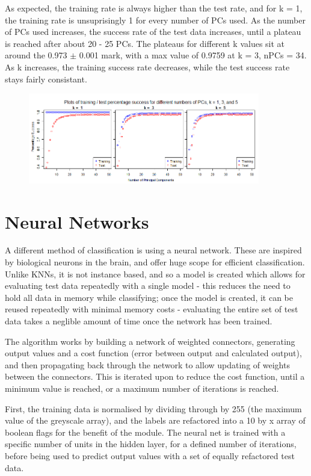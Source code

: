 \documentclass[11pt]{article} %
\begin{document}
As expected, the training rate is always higher than the test rate, and for k = 1, the training rate is unsuprisingly 1 for every number of PCs used. As the number of PCs used increases, the success rate of the test data increases, until a plateau is reached after about 20 - 25 PCs. The plateaus for different k values sit at around the 0.973 $\pm$ 0.001 mark, with a max value of 0.9759 at k = 3, nPCs = 34. As k increases, the training success rate decreases, while the test success rate stays fairly consistant. 

\begin{figure}[htb!]
\includegraphics[width = 0.9\textwidth]{pca_kvar_traintest.png}
\caption{} 
\label{fig:pca_rkvar}
\end{figure}




\section{Neural Networks}

A different method of classification is using a neural network. These are inspired by biological neurons in the brain, and offer huge scope for efficient classification. Unlike KNNs, it is not instance based, and so a model is created which allows for evaluating test data repeatedly with a single model - this reduces the need to hold all data in memory while classifying; once the model is created, it can be reused repeatedly with minimal memory costs - evaluating the entire set of test data takes a neglible amount of time once the network has been trained.

The algorithm works by building a network of weighted connectors, generating output values and a cost function (error between output and calculated output), and then propagating back through the network to allow updating of weights between the connectors. This is iterated upon to reduce the cost function, until a minimum value is reached, or a maximum number of iterations is reached. 

First, the training data is normalised by dividing through by 255 (the maximum value of the greyscale array), and the labels are refactored into a 10 by x array of boolean flags for the benefit of the module.  The neural net is trained with a specific number of units in the hidden layer, for a defined number of iterations, before being used to predict output values with  a set of equally refactored test data. 
\end{document}
